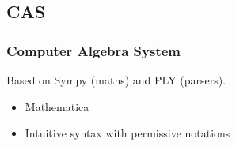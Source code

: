 \subsection{CAS}
\begin{frame}[fragile]
    \frametitle{Computer Algebra System}
    Based on \alert{Sympy} (maths) and \alert{PLY} (parsers).
    
    \vfill    
    
    \begin{itemize}
        \item<3-> Mathematica
        \item<4-> Intuitive syntax with permissive notations 
    \end{itemize}
\end{frame}
